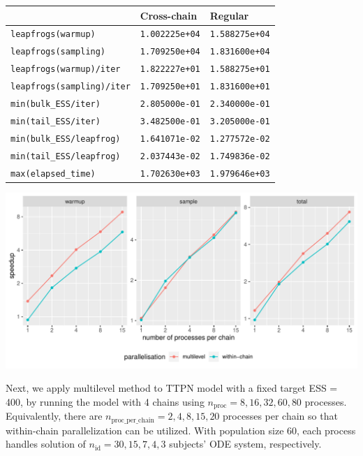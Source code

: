 \documentclass[landscape,a0paper,fontscale=0.5]{baposter} %
\begin{document}
\begin{poster}
{\begin{multicols}{2}
\begin{center}
\begin{tabular}{l l l}
\hline
 & Cross-chain & Regular \\
\hline
 \texttt{leapfrogs(warmup)}        &  \texttt{1.002225e+04}  & \texttt{1.588275e+04}\\
 \texttt{leapfrogs(sampling)}      &  \texttt{1.709250e+04}  & \texttt{1.831600e+04}\\
 \texttt{leapfrogs(warmup)/iter}   &  \texttt{1.822227e+01}  & \texttt{1.588275e+01}\\
 \texttt{leapfrogs(sampling)/iter} &  \texttt{1.709250e+01}  & \texttt{1.831600e+01}\\
 \texttt{min(bulk\_ESS/iter)}       & \texttt{2.805000e-01}  & \texttt{2.340000e-01}\\
 \texttt{min(tail\_ESS/iter)}       & \texttt{3.482500e-01}  & \texttt{3.205000e-01}\\
 \texttt{min(bulk\_ESS/leapfrog)}   & \texttt{1.641071e-02}  & \texttt{1.277572e-02}\\
 \texttt{min(tail\_ESS/leapfrog)}   & \texttt{2.037443e-02}  & \texttt{1.749836e-02}\\
 \texttt{max(elapsed\_time)}        & \texttt{1.702630e+03}  & \texttt{1.979646e+03}
\end{tabular}
\end{center}

\begin{center}
\includegraphics[width=\linewidth]{./figure/ttpn2_perf_benchmark.pdf}
\end{center}

Next, we apply multilevel method to TTPN model with a fixed target ESS
= 400, by running the model
with 4 chains using \(n_{\text{proc}} = 8, 16, 32, 60, 80\)
processes. Equivalently, there are
\(n_{\text{proc\_per\_chain}} = 2, 4, 8, 15, 20\)
processes per chain so that within-chain parallelization can be utilized.
With population size 60, each process handles solution of
\(n_{\text{id}} = 30, 15, 7, 4, 3\)
subjects' ODE system, respectively.


\end{multicols}}
\end{poster}
\end{document}
